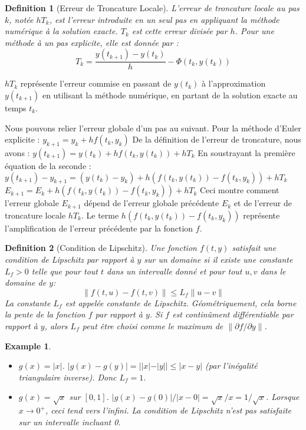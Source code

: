 \documentclass{article}
\newtheorem{definition}{Definition}
\newtheorem{example}{Example}
\begin{document}
\begin{definition}[Erreur de Troncature Locale]
L'erreur de troncature locale au pas $k$, notée $h T_k$, est l'erreur introduite en un seul pas en appliquant la méthode numérique à la solution exacte. $T_k$ est cette erreur divisée par $h$. Pour une méthode à un pas explicite, elle est donnée par :
\[ T_k = \frac{y(t_{k+1}) - y(t_k)}{h} - \Phi(t_k, y(t_k)) \]
\end{definition}
$h T_k$ représente l'erreur commise en passant de $y(t_k)$ à l'approximation $y(t_{k+1})$ en utilisant la méthode numérique, en partant de la solution exacte au temps $t_k$.

Nous pouvons relier l'erreur globale d'un pas au suivant. Pour la méthode d'Euler explicite :
$y_{k+1} = y_k + h f(t_k, y_k)$
De la définition de l'erreur de troncature, nous avons :
$y(t_{k+1}) = y(t_k) + h f(t_k, y(t_k)) + h T_k$
En soustrayant la première équation de la seconde :
$y(t_{k+1}) - y_{k+1} = (y(t_k) - y_k) + h (f(t_k, y(t_k)) - f(t_k, y_k)) + h T_k$
$E_{k+1} = E_k + h (f(t_k, y(t_k)) - f(t_k, y_k)) + h T_k$
Ceci montre comment l'erreur globale $E_{k+1}$ dépend de l'erreur globale précédente $E_k$ et de l'erreur de troncature locale $h T_k$. Le terme $h (f(t_k, y(t_k)) - f(t_k, y_k))$ représente l'amplification de l'erreur précédente par la fonction $f$.

\begin{definition}[Condition de Lipschitz]
Une fonction $f(t, y)$ satisfait une condition de Lipschitz par rapport à $y$ sur un domaine si il existe une constante $L_f > 0$ telle que pour tout $t$ dans un intervalle donné et pour tout $u, v$ dans le domaine de $y$:
\[ \|f(t, u) - f(t, v)\| \le L_f \|u - v\| \]
La constante $L_f$ est appelée constante de Lipschitz. Géométriquement, cela borne la pente de la fonction $f$ par rapport à $y$. Si $f$ est continûment différentiable par rapport à $y$, alors $L_f$ peut être choisi comme le maximum de $\|\partial f / \partial y\|$.
\end{definition}

\begin{example}
\begin{itemize}
    \item $g(x) = |x|$. $|g(x) - g(y)| = ||x| - |y|| \le |x - y|$ (par l'inégalité triangulaire inverse). Donc $L_f=1$.
    \item $g(x) = \sqrt{x}$ sur $[0, 1]$. $|g(x) - g(0)| / |x - 0| = \sqrt{x}/x = 1/\sqrt{x}$. Lorsque $x \to 0^+$, ceci tend vers l'infini. La condition de Lipschitz n'est pas satisfaite sur un intervalle incluant 0.
\end{itemize}
\end{example}
\end{document}
